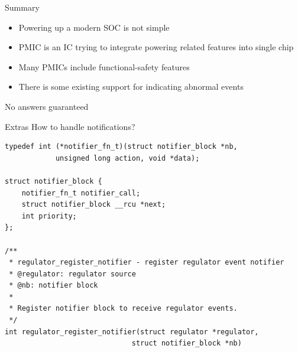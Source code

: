\documentclass[10pt]{beamer}
\begin{document}
\begin{frame}{Summary}
\begin{itemize}
	\item Powering up a modern SOC is not simple
	\item PMIC is an IC trying to integrate powering related features into single chip
	\item Many PMICs include functional-safety features
	\item There is some existing support for indicating abnormal events
\end{itemize}
\end{frame}

\begin{frame}{No answers guaranteed}
\center
{}
\end{frame}

\addtocounter{framenumber}{-1}
\begin{frame}{Extras}
\lstset{language=C}
\scriptsize
How to handle notifications?
\begin{lstlisting}
typedef int (*notifier_fn_t)(struct notifier_block *nb,
			unsigned long action, void *data);

struct notifier_block {
	notifier_fn_t notifier_call;
	struct notifier_block __rcu *next;
	int priority;
};

/**
 * regulator_register_notifier - register regulator event notifier
 * @regulator: regulator source
 * @nb: notifier block
 *
 * Register notifier block to receive regulator events.
 */
int regulator_register_notifier(struct regulator *regulator,
                              struct notifier_block *nb) 
\end{lstlisting}
\end{frame}
\end{document}
